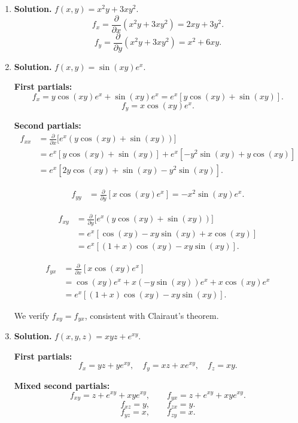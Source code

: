 \begin{enumerate}
\item \textbf{Solution.}
$f(x,y) = x^2y + 3xy^2$.
\[
f_x = \frac{\partial}{\partial x}(x^2y + 3xy^2) = 2xy + 3y^2.
\]
\[
f_y = \frac{\partial}{\partial y}(x^2y + 3xy^2) = x^2 + 6xy.
\]

\item \textbf{Solution.}
$f(x,y) = \sin(xy)e^x$.

\textbf{First partials:}
\[
f_x = y\cos(xy)e^x + \sin(xy)e^x = e^x[y\cos(xy) + \sin(xy)].
\]
\[
f_y = x\cos(xy)e^x.
\]

\textbf{Second partials:}
\begin{align*}
f_{xx} &= \frac{\partial}{\partial x}\bigl[e^x(y\cos(xy)+\sin(xy))\bigr] \\
&= e^x[y\cos(xy)+\sin(xy)] + e^x[-y^2\sin(xy)+y\cos(xy)] \\
&= e^x[2y\cos(xy) + \sin(xy) - y^2\sin(xy)].
\end{align*}

\begin{align*}
f_{yy} &= \frac{\partial}{\partial y}[x\cos(xy)e^x] = -x^2\sin(xy)e^x.
\end{align*}

\begin{align*}
f_{xy} &= \frac{\partial}{\partial y}\bigl[e^x(y\cos(xy)+\sin(xy))\bigr] \\
&= e^x[\cos(xy) - xy\sin(xy) + x\cos(xy)] \\
&= e^x[(1+x)\cos(xy) - xy\sin(xy)].
\end{align*}

\begin{align*}
f_{yx} &= \frac{\partial}{\partial x}[x\cos(xy)e^x] \\
&= \cos(xy)e^x + x(-y\sin(xy))e^x + x\cos(xy)e^x \\
&= e^x[(1+x)\cos(xy) - xy\sin(xy)].
\end{align*}

We verify $f_{xy} = f_{yx}$, consistent with Clairaut's theorem.

\item \textbf{Solution.}
$f(x,y,z) = xyz + e^{xy}$.

\textbf{First partials:}
\[
f_x = yz + ye^{xy}, \quad f_y = xz + xe^{xy}, \quad f_z = xy.
\]

\textbf{Mixed second partials:}
\[
f_{xy} = z + e^{xy} + xye^{xy}, \qquad f_{yx} = z + e^{xy} + xye^{xy}.
\]
\[
f_{xz} = y, \qquad f_{zx} = y.
\]
\[
f_{yz} = x, \qquad f_{zy} = x.
\]


\end{enumerate}
